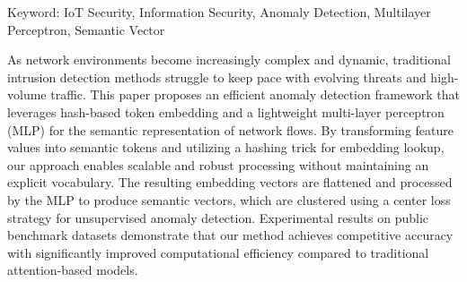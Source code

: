 \begin{EnAbstract}
    \begin{EnAbstractItems}








        \noindent \text Keyword: IoT Security, Information Security, Anomaly Detection, Multilayer Perceptron, Semantic Vector

    \end{EnAbstractItems}

    \begin{EnAbstractDescription}
        As network environments become increasingly complex and dynamic, traditional intrusion detection methods struggle to keep pace with evolving threats and high-volume traffic. This paper proposes an efficient anomaly detection framework that leverages hash-based token embedding and a lightweight multi-layer perceptron (MLP) for the semantic representation of network flows. By transforming feature values into semantic tokens and utilizing a hashing trick for embedding lookup, our approach enables scalable and robust processing without maintaining an explicit vocabulary. The resulting embedding vectors are flattened and processed by the MLP to produce semantic vectors, which are clustered using a center loss strategy for unsupervised anomaly detection. Experimental results on public benchmark datasets demonstrate that our method achieves competitive accuracy with significantly improved computational efficiency compared to traditional attention-based models.

    \end{EnAbstractDescription}

\end{EnAbstract}

